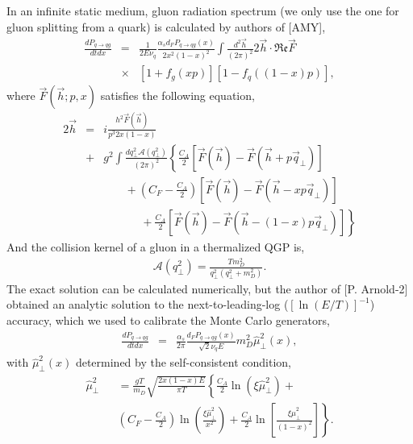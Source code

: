 \documentclass[aps, prc, reprint, amsmath, groupedaddress, nofootinbib]{revtex4-1}
\begin{document}
In an infinite static medium, gluon radiation spectrum (we only use the one for gluon splitting from a quark) is calculated by authors of [AMY],
\begin{eqnarray}\label{eq:AMY-1}
\nonumber
\frac{dP_{q\rightarrow qg}}{dt dx} &=& \frac{1}{2E\nu_q} \frac{\alpha_s d_F P_{q\rightarrow qg}(x)}{2x^2(1-x)^2}\int\frac{d^2\vec{h}}{(2\pi)^2}2\vec{h}\cdot \mathfrak{Re} \vec{F} \\
&\times& [1+f_g(xp)][1-f_q((1-x)p)],
\end{eqnarray}
where $\vec{F}(\vec{h}; p, x)$ satisfies the following equation,
\begin{eqnarray}\label{eq:AMY-2}
\nonumber
2\vec{h} &=& i\frac{h^2 \vec{F}(\vec{h})}{p^3 2x(1-x)} \\
\nonumber
&+& g^2\int \frac{dq_\perp^2 \mathcal{A}(q_\perp^2)}{(2\pi)^2}\left\{\frac{C_A}{2}\left[\vec{F}(\vec{h}) - \vec{F}(\vec{h}+p\vec{q}_\perp)\right]\right. \\
\nonumber
&& \phantom{ssss} + \left(C_F - \frac{C_A}{2}\right)\left[\vec{F}(\vec{h}) - \vec{F}(\vec{h}-xp\vec{q}_\perp)\right] \\
&& \phantom{sssssss} + \left. \frac{C_A}{2}\left[\vec{F}(\vec{h}) - \vec{F}(\vec{h}-(1-x)p\vec{q}_\perp)\right] \right\}
\end{eqnarray}
And the collision kernel of a gluon in a thermalized QGP is,
\begin{eqnarray}
\mathcal{A}(q_\perp^2) = \frac{T m_D^2}{q_\perp^2(q_\perp^2+m_D^2)}.
\end{eqnarray}
The exact solution can be calculated numerically, but the author of [P. Arnold-2] obtained an analytic solution to the next-to-leading-log ($[\ln(E/T)]^{-1}$) accuracy, which we used to calibrate the Monte Carlo generators,
\begin{eqnarray}\label{eq:AMY-NLL}
\frac{dP_{q\rightarrow qg}}{dt dx} &=& \frac{\alpha_s}{2\pi}\frac{ d_F P_{q\rightarrow qg}(x)}{\sqrt{2}\nu_q E} m_D^2 \hat{\mu}_\perp^2(x),
\end{eqnarray}
with $\hat{\mu}_\perp^2(x)$ determined by the self-consistent condition,
\begin{eqnarray}\label{eq:AMY-sf}
\nonumber
\hat{\mu}_\perp^2 && = \frac{gT}{m_D} \sqrt{\frac{2x(1-x)E}{\pi T}}\left\{\frac{C_A}{2}\ln(\xi\hat{\mu}_\perp^2) + \right. \\
&&\left.\left(C_F-\frac{C_A}{2}\right)\ln\left(\frac{\xi\hat{\mu}_\perp^2}{x^2}\right) + \frac{C_A}{2}\ln\left[\frac{\xi\hat{\mu}_\perp^2}{(1-x)^2}\right]\right\}.
\end{eqnarray}
\end{document}

